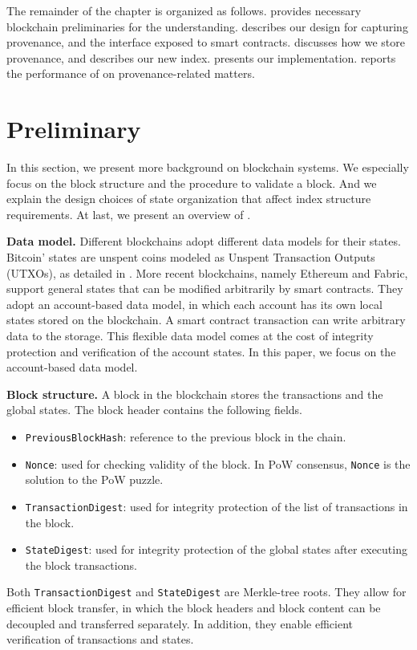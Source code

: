 The remainder of the chapter is organized as follows.  provides necessary blockchain preliminaries for the understanding.  describes our design for capturing provenance, and the interface
exposed to smart contracts.  discusses how we store provenance, and
 describes our new index.  presents our
implementation.  reports the performance of {\fs} on provenance-related matters. 

\section{Preliminary}
\label{prov:sec:background}
In this section, we present more background on blockchain systems.
We especially focus on the block structure and the procedure to validate a block. 
And we explain the design choices of state organization that affect index structure requirements.
At last, we present an overview of {\fs}. 

\textbf{Data model.} Different blockchains adopt different data models for their states. Bitcoin' states
are unspent coins modeled as Unspent Transaction Outputs (UTXOs), as detailed in . More recent blockchains, namely Ethereum and Fabric, support general states that can be modified arbitrarily
by smart contracts.  They adopt an account-based data model, in which each account has its own local states
stored on the blockchain. A smart contract transaction can write arbitrary data to the storage. This flexible
data model comes at the cost of integrity protection and verification of the account states. In this paper, we
focus on the account-based data model.

\textbf{Block structure.} A block in the blockchain stores the transactions and the global states.
The block header contains the following fields.  
\begin{itemize} 
    \item \texttt{PreviousBlockHash}: reference to the previous block in the chain. 
    \item \texttt{Nonce}: used for checking validity of the block. In PoW consensus, \texttt{Nonce} is the solution to the PoW puzzle. 
    \item \texttt{TransactionDigest}: used for integrity protection of the list of transactions in the block. 
    \item \texttt{StateDigest}: used for integrity protection of the global states after executing the block transactions. 
\end{itemize}
Both \texttt{TransactionDigest} and \texttt{StateDigest} are Merkle-tree roots. They allow for efficient block
transfer, in which the block headers and block content can be decoupled and transferred separately. In
addition, they enable efficient verification of transactions and states.


